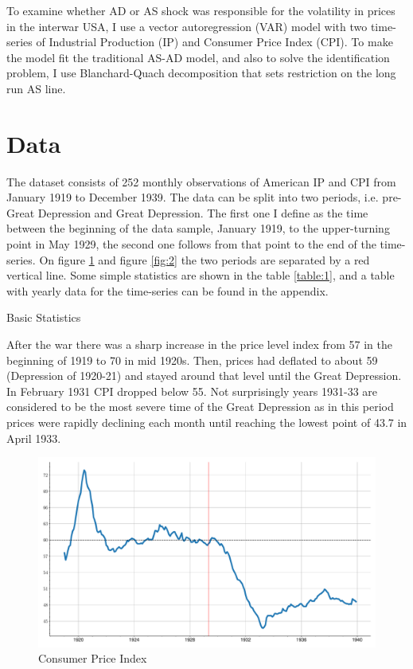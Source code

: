 \documentclass[a4paper,12pt]{article}
\begin{document}
To examine whether AD or AS shock was responsible for the volatility in prices in the interwar USA, I use a vector autoregression (VAR) model with two time-series of Industrial Production (IP) and Consumer Price Index (CPI). To make the model fit the traditional AS-AD model, and also to solve the identification problem, I use Blanchard-Quach decomposition that sets restriction on the long run AS line.


\section{Data}

The dataset consists of 252 monthly observations of American IP and CPI from January 1919 to December 1939. The data can be split into two periods, i.e. pre-Great Depression and Great Depression. The first one I define as the time between the beginning of the data sample, January 1919, to the upper-turning point in May 1929, the second one follows from that point to the end of the time-series. On figure \ref{fig:1} and figure \ref{fig:2} the two periods are separated by a red vertical line. Some simple statistics are shown in the table \ref{table:1}, and a table with yearly data for the time-series can be found in the appendix. 

\begin{table}[h]
\caption{Basic Statistics}
\label{table:1}
\centering

\end{table}

After the war there was a sharp increase in the price level index from 57 in the beginning of 1919 to 70 in mid 1920s. Then, prices had deflated to about 59 (Depression of 1920-21) and stayed around that level until the Great Depression. In February 1931 CPI dropped below 55. Not surprisingly years 1931-33 are considered to be the most severe time of the Great Depression as in this period prices were rapidly declining each month until reaching the lowest point of 43.7 in April 1933.

\begin{figure}[!htb]
    \centering
\caption{Consumer Price Index}
\label{fig:1}
    \includegraphics[width=\textwidth]{../output/figures/ts_CPI.pdf} 
\end{figure}
\end{document}
